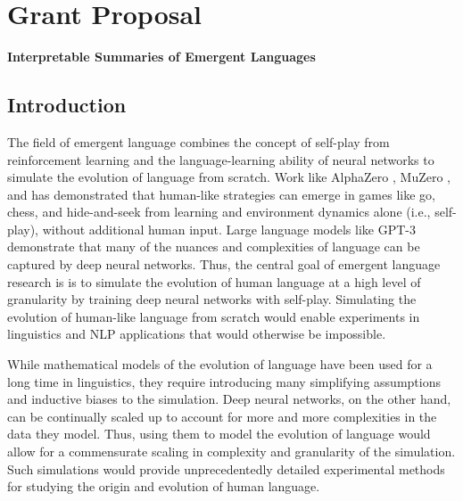 \chapter{Grant Proposal}

{\Large\bf Interpretable Summaries of Emergent Languages}

\section{Introduction}

The field of emergent language combines the concept of self-play from reinforcement learning and the language-learning ability of neural networks to simulate the evolution of language from scratch.
Work like AlphaZero \citep{silver2017mastering}, MuZero \citep{schrittwiser2020mastering}, and \citet{Baker2020Emergent} has demonstrated that human-like strategies can emerge in games like go, chess, and hide-and-seek from learning and environment dynamics alone (i.e., self-play), without additional human input.
Large language models like GPT-3 \citep{brown2020language} demonstrate that many of the nuances and complexities of language can be captured by deep neural networks.
Thus, the central goal of emergent language research is is to simulate the evolution of human language at a high level of granularity by training deep neural networks with self-play.
Simulating the evolution of human-like language from scratch would enable experiments in linguistics and NLP applications that would otherwise be impossible.

While mathematical models of the evolution of language have been used for a long time in linguistics, they require introducing many simplifying assumptions and inductive biases to the simulation.
Deep neural networks, on the other hand, can be continually scaled up to account for more and more complexities in the data they model.
Thus, using them to model the evolution of language would allow for a commensurate scaling in complexity and granularity of the simulation.
Such simulations would provide unprecedentedly  detailed experimental methods for studying the origin and evolution of human language.

